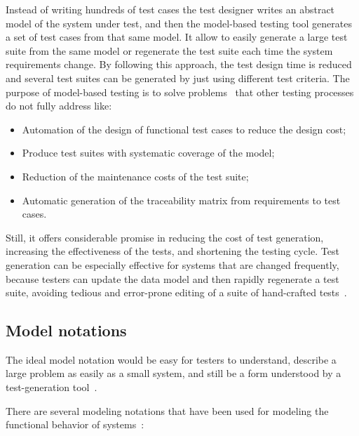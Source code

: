 Instead of writing hundreds of test cases the test designer writes an abstract
model of the system under test, and then the model-based testing tool generates
a set of test cases from that same model. It allow to easily generate a large
test suite from the same model or regenerate the test suite each time the system
requirements change. By following this approach, the test design time is reduced
and several test suites can be generated by just using different test criteria.
The purpose of model-based testing is to solve problems~\cite{1200168} that
other testing processes do not fully address like:
\begin{itemize}
\item Automation of the design of functional test cases to reduce the design cost;
\item Produce test suites with systematic coverage of the model;
\item Reduction of the maintenance costs of the test suite;
\item Automatic generation of the traceability matrix from requirements to test cases.
\end{itemize}
Still, it offers considerable promise in reducing the cost of test generation,
increasing the effectiveness of the tests, and shortening the testing cycle.
Test generation can be especially effective for systems that are changed
frequently, because testers can update the data model and then rapidly
regenerate a test suite, avoiding tedious and error-prone editing of a suite of
hand-crafted tests~\cite{Dalal1999}.

\subsection{Model notations}

The ideal model notation would be easy for testers to understand, describe a
large problem as easily as a small system, and still be a form understood by a
test-generation tool~\cite{Dalal1999}. 

There are several modeling notations that have been used for modeling the
functional behavior of systems~\cite{1200168}: 

